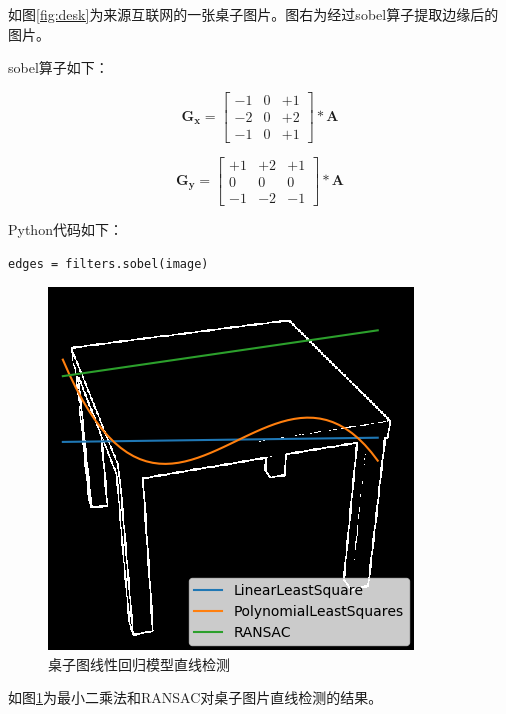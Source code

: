 \documentclass{article}
\begin{document}
如图\ref{fig:desk}为来源互联网的一张桌子图片。图右为经过sobel算子提取边缘后的图片。

sobel算子如下：

\begin{equation}
\mathbf{G}_{\mathbf{x}}=\left[\begin{array}{rrr}{-1} & {0} & {+1} \\ {-2} & {0} & {+2} \\ {-1} & {0} & {+1}\end{array}\right] * \mathbf{A}
\end{equation}

\begin{equation}
\mathbf{G}_{\mathbf{y}}=\left[\begin{array}{ccc}{+1} & {+2} & {+1} \\ {0} & {0} & {0} \\ {-1} & {-2} & {-1}\end{array}\right] * \mathbf{A}
\end{equation}

Python代码如下：

\begin{lstlisting}[title={sobel算子}]
edges = filters.sobel(image)
\end{lstlisting}

\begin{figure}[ht]
	\centering
	\includegraphics{../code/img/desk_LinearRegression.png}
	\caption{桌子图线性回归模型直线检测}
	\label{fig:desk-LinearRegression}
\end{figure}

如图\ref{fig:desk-LinearRegression}为最小二乘法和RANSAC对桌子图片直线检测的结果。
\end{document}
